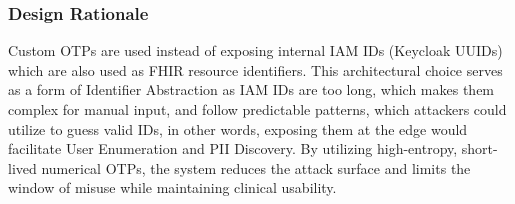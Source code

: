 \subsubsection{Design Rationale}



Custom OTPs are used instead of exposing internal IAM IDs (Keycloak UUIDs) which are also used as FHIR resource identifiers. 
This architectural choice serves as a form of Identifier Abstraction as IAM IDs are too long, which makes them complex for manual input, and follow predictable patterns, which attackers could utilize to guess valid IDs,
in other words, exposing them at the edge would facilitate User Enumeration and \ac{PII} Discovery. 
By utilizing high-entropy, short-lived numerical OTPs, the system reduces the attack surface and limits the window of misuse while maintaining clinical usability.




